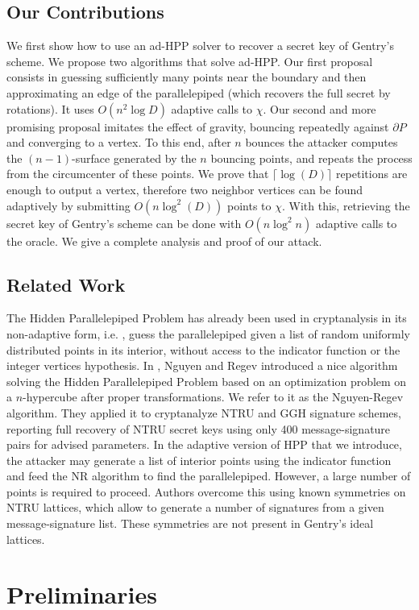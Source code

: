 \documentclass[11pt]{article}
\theoremstyle{plain}
\theoremstyle{definition}
\theoremstyle{remark}
\newcommand{\ie}{i.e.$\!$ }
\begin{document}
\subsection{Our Contributions}
We first show how to use an ad-HPP solver to recover a secret key of Gentry's scheme. We propose two algorithms that solve ad-HPP. Our first proposal consists in guessing sufficiently many points near the boundary and then approximating an edge of the parallelepiped (which recovers the full secret by rotations). It uses $O(n^2\log D)$ adaptive calls to $\chi$. Our second and more promising proposal imitates the effect of gravity, bouncing repeatedly against $\partial P$ and converging to a vertex. To this end, after $n$ bounces the attacker computes the $(n-1)$-surface generated by the $n$ bouncing points, and repeats the process from the circumcenter of these points. We prove that $\lceil\log(D)\rceil$ repetitions are enough to output a vertex, therefore two neighbor vertices can be found adaptively by submitting $O(n\log^2(D))$ points to $\chi$. With this, retrieving the secret key of Gentry's scheme can be done with $O(n\log^2 n)$ adaptive calls to the oracle. We give a complete analysis and proof of our attack. 
\subsection{Related Work}
The Hidden Parallelepiped Problem has already been used in cryptanalysis in its non-adaptive form, \ie, guess the parallelepiped given a list of random uniformly distributed points in its interior, without access to the indicator function or the integer vertices hypothesis. In \cite{Nguyen2009}, Nguyen and Regev introduced a nice algorithm solving the Hidden Parallelepiped Problem based on an optimization problem on a $n$-hypercube after proper transformations. We refer to it as the Nguyen-Regev algorithm. They applied it to cryptanalyze NTRU and GGH signature schemes, reporting full recovery of NTRU secret keys using only 400 message-signature pairs for advised parameters. In the adaptive version of HPP that we introduce, the attacker may generate a list of interior points using the indicator function and feed the NR algorithm to find the parallelepiped. However, a large number of points is required to proceed. Authors overcome this using known symmetries on NTRU lattices, which allow to generate a number of signatures from a given message-signature list. These symmetries are not present in Gentry's ideal lattices.

\section{Preliminaries}
\end{document}
